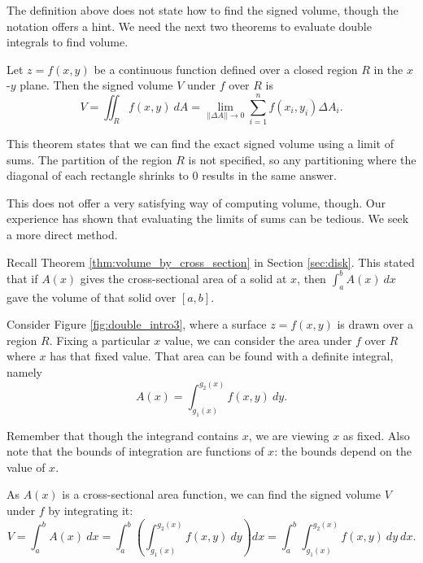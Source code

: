 The definition above does not state how to find the signed volume, though the notation offers a hint. We need the next two theorems to evaluate double integrals to find volume.

{Let $z=f(x,y)$ be a continuous function defined over a closed region $R$ in the $x$-$y$ plane. Then the signed volume $V$ under $f$ over $R$ is
$$V = \iint_R f(x,y)\ dA = \lim_{||\Delta A||\to 0}\sum_{i=1}^n f(x_i,y_i)\Delta A_i.$$
}

This theorem states that we can find the exact signed volume using a limit of sums. The partition of the region $R$ is not specified, so any partitioning where the diagonal of each rectangle shrinks to 0 results in the same answer. 

This does not offer a very satisfying way of computing volume, though. Our experience has shown that evaluating the limits of sums can be tedious. We seek a more direct method.

Recall Theorem \ref{thm:volume_by_cross_section} in Section \ref{sec:disk}. This stated that if $A(x)$ gives the cross-sectional area of a solid at $x$, then $\int_a^b A(x)\ dx$ gave the volume of that solid over $[a,b]$. 

Consider Figure \ref{fig:double_intro3}, where a surface $z=f(x,y)$ is drawn over a region $R$. Fixing a particular $x$ value, we can consider the area under $f$ over $R$ where $x$ has that fixed value. That area can be found with a definite integral, namely $$ A(x)=\int_{g_1(x)}^{g_2(x)} f(x,y)\ dy.$$

Remember that though the integrand contains $x$, we are viewing $x$ as fixed. Also note that the bounds of integration are functions of $x$: the bounds depend on the value of $x$. 


As $A(x)$ is a cross-sectional area function, we can find the signed volume $V$ under $f$ by integrating it:
$$V = \int_a^b A(x)\ dx = \int_a^b\left(\int_{g_1(x)}^{g_2(x)} f(x,y)\ dy\right)dx = \int_a^b\int_{g_1(x)}^{g_2(x)} f(x,y)\ dy\ dx.$$

